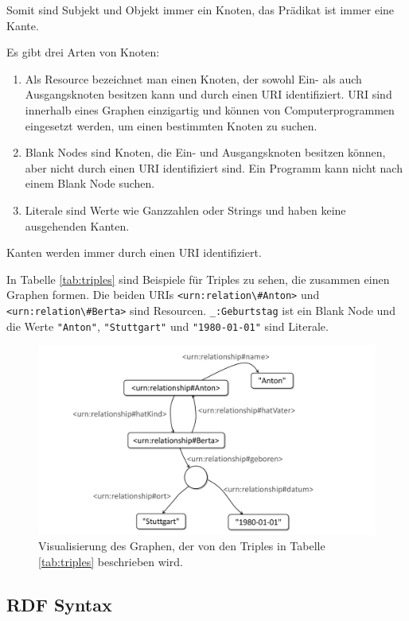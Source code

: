 	Somit sind Subjekt und Objekt immer ein Knoten, das Prädikat ist immer eine Kante.
	
	Es gibt drei Arten von Knoten:
	\begin{enumerate}
		\item Als Resource bezeichnet man einen Knoten, der sowohl Ein- als auch Ausgangsknoten besitzen kann und durch einen URI identifiziert. URI sind innerhalb eines Graphen einzigartig und können von Computerprogrammen eingesetzt werden, um einen bestimmten Knoten zu suchen.
		\item Blank Nodes sind Knoten, die Ein- und Ausgangsknoten besitzen können, aber nicht durch einen URI identifiziert sind. Ein Programm kann nicht nach einem Blank Node suchen.
		\item Literale sind Werte wie Ganzzahlen oder Strings und haben keine ausgehenden Kanten.	
	\end{enumerate}
	Kanten werden immer durch einen URI identifiziert.
	
	In Tabelle \ref{tab:triples} sind Beispiele für Triples zu sehen, die zusammen einen Graphen formen. Die beiden URIs \lstinline|<urn:relation\#Anton>| und \lstinline|<urn:relation\#Berta>| sind Resourcen. \lstinline|_:Geburtstag| ist ein Blank Node und die Werte \lstinline|"Anton"|, \lstinline|"Stuttgart"| und \lstinline|"1980-01-01"| sind Literale.
	
	
	
	\begin{figure}
		\centering
		\includegraphics[width=0.7\linewidth]{resources/figures/rdfGraph}
		\caption{Visualisierung des Graphen, der von den Triples in Tabelle \ref{tab:triples} beschrieben wird. }
		\label{fig:rdfgraph}
	\end{figure}


	\subsection{RDF Syntax}

